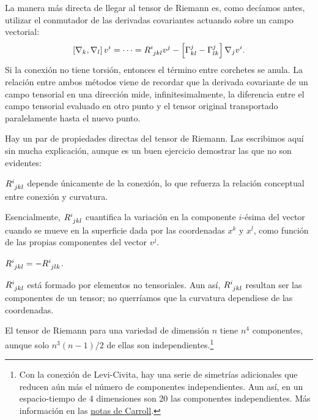 La manera más directa de llegar al tensor de Riemann es, como decíamos antes, utilizar el conmutador de las derivadas covariantes actuando sobre un campo vectorial:
\begin{equation}
    \left[\nabla_k, \nabla_l\right]v^i = \cdots = \tensor{R}{^i_{jkl}} v^j - \left[\Gamma^j_{kl} - \Gamma^j_{lk}\right]\nabla_j v^i.
\end{equation}
Si la conexión no tiene torsión, entonces el término entre corchetes se anula. La relación entre ambos métodos viene de recordar que la derivada covariante de un campo tensorial en una dirección mide, infinitesimalmente, la diferencia entre el campo tensorial evaluado en otro punto y el tensor original transportado paralelamente hasta el nuevo punto.

Hay un par de propiedades directas del tensor de Riemann. Las escribimos aquí sin mucha explicación, aunque es un buen ejercicio demostrar las que no son evidentes:
\begin{myitemize}
    \item \(\tensor{R}{^i_{jkl}}\) depende únicamente de la conexión, lo que refuerza la relación conceptual entre conexión y curvatura.
    \item Esencialmente, \(\tensor{R}{^i_{jkl}}\) cuantifica la variación en la componente \(i\)-ésima del vector cuando se mueve en la superficie dada por las coordenadas \(x^{k}\) y \(x^{l}\), como función de las propias componentes del vector \(v^{j}\).
    \item \(\tensor{R}{^i_{jkl}} = -\tensor{R}{^{i}_{jlk}}\).
    \item \(\tensor{R}{^i_{jkl}}\) está formado por elementos no tensoriales. Aun así, \(\tensor{R}{^i_{jkl}}\) resultan ser las componentes de un tensor; no querríamos que la curvatura dependiese de las coordenadas.
    \item El tensor de Riemann para una variedad de dimensión \(n\) tiene \(n^4\) componentes, aunque solo \(n^3(n-1)/2\) de ellas son independientes.\footnote{Con la conexión de Levi-Civita, hay una serie de simetrías adicionales que reducen aún más el número de componentes independientes. Aun así, en un espacio-tiempo de 4 dimensiones son 20 las componentes independientes. Más información en las \href{https://preposterousuniverse.com/grnotes/}{notas de Carroll}.}
\end{myitemize}

